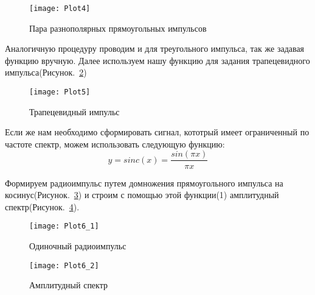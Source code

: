 \begin{figure}[H]
	\begin{center}
		\texttt{[image: Plot4]}
		\caption{Пара разнополярных прямоугольных импульсов} 
		\label{pic:Plot4} %
	\end{center}
\end{figure}

Аналогичную процедуру проводим и для треугольного импульса, так же задавая функцию вручную. Далее  используем нашу функцию для задания трапецевидного импульса(Рисунок.~\ref{pic:Plot5})


\parindent=1cm %

\begin{figure}[H]
	\begin{center}
		\texttt{[image: Plot5]}
		\caption{Трапецевидный импульс} 
		\label{pic:Plot5} %
	\end{center}
\end{figure}

Если же нам необходимо  сформировать сигнал, кототрый имеет ограниченный по частоте спектр, можем использовать следующую функцию: \begin{equation} y = sinc(x) = \frac{sin(\pi  x)}{\pi x} \end{equation}

Формируем радиоимпульс путем домножения прямоугольного импульса на косинус(Рисунок.~\ref{pic:Plot6_1}) и строим с помощью этой функции(1) амплитудный спектр(Рисунок.~\ref{pic:Plot6_2}).


\parindent=1cm %

\begin{figure}[H]
	\begin{center}
		\texttt{[image: Plot6\_1]}
		\caption{Одиночный радиоимпульс} 
		\label{pic:Plot6_1} %
	\end{center}
\end{figure}

\begin{figure}[H]
	\begin{center}
		\texttt{[image: Plot6\_2]}
		\caption{Амплитудный спектр} 
		\label{pic:Plot6_2} %
	\end{center}
\end{figure}

